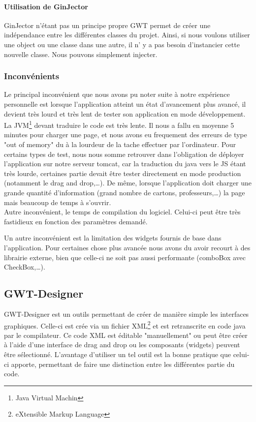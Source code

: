 \paragraph{Utilisation de GinJector}
GinJector n'étant pas un principe propre GWT permet de créer une indépendance entre les différentes classes du projet. Ainsi, si nous voulons utiliser une object ou une classe dans une autre, il n' y a pas besoin d'instancier cette nouvelle classe. Nous pouvons simplement injecter.

\subsubsection{Inconvénients}
Le principal inconvénient que nous avons pu noter suite à notre expérience personnelle est lorsque l'application atteint un état d'avancement plus avancé, il devient très lourd et très lent de tester son application en mode développement. La JVM\footnote{Java Virtual Machin} devant traduire le code est très lente. Il nous a fallu en moyenne 5 minutes pour charger une page, et nous avons eu frequement des erreurs de type "out of memory" du à la lourdeur de la tache effectuer par l'ordinateur. Pour certains types de test, nous nous somme retrouver dans l'obligation de déployer l'application sur notre serveur tomcat, car la traduction du java vers le JS étant très lourde, certaines partie devait être tester directement en mode production (notamment le drag and drop,…). De même, lorsque l'application doit charger une grande quantité d'information (grand nombre de cartons, professeurs,…) la page mais beaucoup de temps à s'ouvrir.\\
Autre inconvénient, le temps de compilation du logiciel. Celui-ci peut être très fastidieux en fonction des paramètres demandé.
	
Un autre inconvénient est la limitation des widgets fournis de base dans l'application. Pour certaines chose plus avancée nous avons du avoir recourt à des librairie externe, bien que celle-ci ne soit pas aussi performante (comboBox avec CheckBox,…).

\subsection{GWT-Designer}
GWT-Designer est un outils permettant de créer de manière simple les interfaces graphiques. Celle-ci est crée via un fichier XML\footnote{eXtensible Markup Language} et est retranscrite en code java par le compilateur. Ce code XML est éditable "manuellement" ou peut être créer à l'aide d'une interface de drag and drop ou les composants (widgets) peuvent être sélectionné. L'avantage d'utiliser un tel outil est la bonne pratique que celui-ci apporte, permettant de faire une distinction entre les différentes partie du code.

